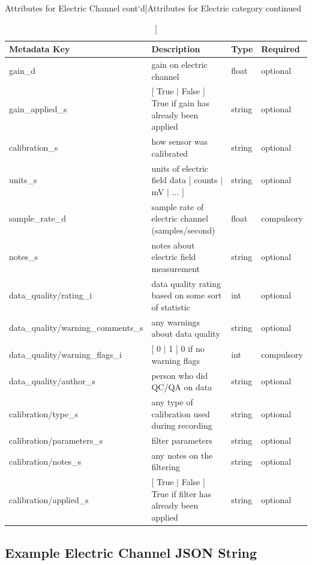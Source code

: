 \documentclass{article}
\begin{document}
\newpage
\begin{table}[htb!]
	\caption[Attributes for Electric Channel cont`d]{Attributes for Electric category continued}
	\begin{tabular}{|l|p{3in}|l|l|}
		\hline
		\textbf{Metadata Key} & \textbf{Description} & \textbf{Type} & \textbf{Required} \\ \hline
		gain\_d & gain on electric channel & float & optional \\ \hline
		gain\_applied\_s & [ True $|$ False ] True if gain has already been applied & string & optional \\ \hline
		calibration\_s & how sensor was calibrated  & string & optional \\ \hline
		units\_s & units of electric field data [ counts $|$ mV $|$ ... ] & string &  optional \\ \hline
		sample\_rate\_d & sample rate of electric channel (samples/second) & float & compulsory \\ \hline
		notes\_s & notes about electric field measurement & string &  optional\\ \hline
		data\_quality/rating\_i & data quality rating based on some sort of statistic & int &  optional\\ \hline
		data\_quality/warning\_comments\_s & any warnings about data quality & string & optional \\ \hline
		data\_quality/warning\_flags\_i & [ 0 $|$ 1 ] 0 if no warning flags & int & compulsory\\ \hline
		data\_quality/author\_s & person who did QC/QA on data & string & optional \\ \hline
		calibration/type\_s & any type of calibration used during recording & string & optional \\ \hline
		calibration/parameters\_s & filter parameters & string & optional \\ \hline
		calibration/notes\_s & any notes on the filtering & string & optional \\ \hline
		calibration/applied\_s & [ True $|$ False ] True if filter has already been applied & string & optional \\ \hline
		\end{tabular}
		\label{tab:electric02}
\end{table}	

\newpage
\subsection{Example Electric Channel JSON String}
\end{document}
